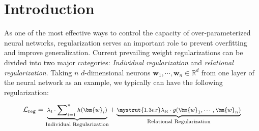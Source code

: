 \title{}

\begin{abstract}
Due to the over-parameterization nature, neural networks are a powerful tool for nonlinear function approximation. In order to achieve good generalization on unseen data, a suitable inductive bias is of great importance for neural networks. One of the most straightforward ways is to regularize the neural network with some additional objectives. $\ell_2$ regularization serves as a standard regularization for neural networks. Despite its popularity, it essentially regularizes one dimension of the individual neuron, which is not strong enough to control the capacity of highly over-parameterized neural networks. Motivated by this, hyperspherical uniformity is proposed as a novel family of relational regularizations that impact the interaction among neurons. We consider several geometrically distinct ways to achieve hyperspherical uniformity. The effectiveness of hyperspherical uniformity is justified by theoretical insights and empirical evaluations.
\end{abstract}

\section{Introduction}

As one of the most effective ways to control the capacity of over-parameterized neural networks, regularization serves an important role to prevent overfitting and improve generalization. Current prevailing weight regularizations can be divided into two major categories: \emph{Individual regularization} and \emph{relational regularization}. Taking $n$ $d$-dimensional neurons $\bm{w}_1,\cdots,\bm{w}_n\in\mathbb{R}^d$ from one layer of the neural network as an example, we typically can have the following regularization:

\begin{equation*}
\footnotesize
   \mathcal{L}_{\text{reg}} = \underbrace{\lambda_{\text{I}}\cdot\sum\nolimits_{i=1}^n h(\bm{w}_i)}_{\text{Individual Regularization}} +  \underbrace{ \mystrut{1.3ex}\lambda_{\textnormal{R}}\cdot g(\bm{w}_1,\cdots,\bm{w}_n)}_{\text{Relational Regularization}}
\end{equation*}

